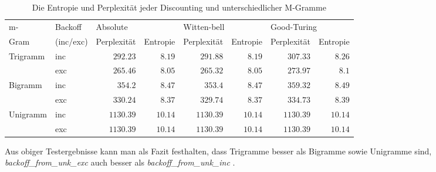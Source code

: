  
\begin{table}[h]
  \begin{center}
  \small\addtolength{\tabcolsep}{-5pt}
    \begin{tabular}{l|l|r|r|r|r|r|r}
     \toprule
     m- &Backoff &\multicolumn{2}{|l|}{Absolute}&\multicolumn{2}{|l|}{Witten-bell}&\multicolumn{2}{l}{Good-Turing}\\
	  \cline{3-8}
	  Gram&(inc/exc)&Perplexit\"at&Entropie&Perplexit\"at&Entropie&Perplexit\"at&Entropie\\
    \hline
    \hline
		Trigramm &inc 	& $292.23$ 	& $8.19$ 	& $291.88$ 	& $8.19$ 	& $307.33$ 	& $8.26$\\
				 		 &exc		& $265.46$ 	& $8.05$ 	& $265.32$ 	& $8.05$ 	& $273.97$ 	& $8.1$\\
		\hline
		Bigramm  &inc 	& $354.2$ 	& $8.47$ 	& $353.4$ 	& $8.47$ 	& $359.32$ 	& $8.49$\\
				 		 &exc		& $330.24$ 	& $8.37$ 	& $329.74$ 	& $8.37$ 	& $334.73$ 	& $8.39$\\
		\hline
		Unigramm &inc 	& $1130.39$ & $10.14$ & $1130.39$ & $10.14$ & $1130.39$ & $10.14$\\
				 		 &exc		& $1130.39$ & $10.14$ & $1130.39$ & $10.14$ & $1130.39$ & $10.14$\\
     \bottomrule

    \end{tabular}
  \end{center}
     \caption{Die Entropie und Perplexit\"at jeder Discounting und unterschiedlicher M-Gramme}
\label{tab:table_3}
\end{table}
 
Aus obiger Testergebnisse kann man als Fazit festhalten, dass Trigramme besser als Bigramme sowie Unigramme sind, \emph{backoff\_from\_unk\_exc} auch besser als \emph{backoff\_from\_unk\_inc} .
 